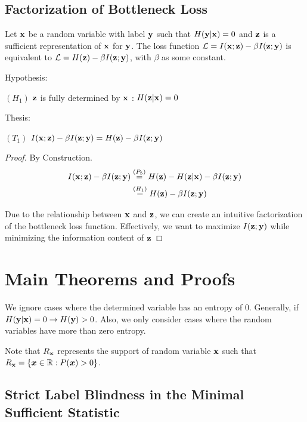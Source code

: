 \subsection{Factorization of Bottleneck Loss}
\label{app:lossfact}

\begin{lemma}
Let ${\mathbf{x}}$ be a random variable with label ${\mathbf{y}}$ such that $H({\mathbf{y}}| {\mathbf{x}}) = 0$ and ${\mathbf{z}}$ is a sufficient representation of ${\mathbf{x}}$ for ${\mathbf{y}}$. The loss function
$\mathcal{L}=I({\mathbf{x}}; {\mathbf{z}})-\beta I({\mathbf{z}}; {\mathbf{y}})$ is equivalent to $\mathcal{L}=H({\mathbf{z}})-\beta I({\mathbf{z}}; {\mathbf{y}})$, with $\beta$ as some constant.

Hypothesis:

$(H_1)$  ${\mathbf{z}}$ is fully determined by ${\mathbf{x}}$ : $H({\mathbf{z}}|{\mathbf{x}}) = 0$

Thesis:

$(T_1)$ $ I({\mathbf{x}}; {\mathbf{z}})-\beta I({\mathbf{z}}; {\mathbf{y}}) = H({\mathbf{z}})-\beta I({\mathbf{z}}; {\mathbf{y}})$

\begin{proof} By Construction.
$$
\begin{aligned}
I({\mathbf{x}}; {\mathbf{z}})-\beta I({\mathbf{z}}; {\mathbf{y}}) &\stackrel{\left(P_5\right)}{=} H({\mathbf{z}}) - H({\mathbf{z}}| {\mathbf{x}}) -\beta I({\mathbf{z}};{\mathbf{y}}) \\
&\stackrel{\left(H_1\right)}{=} H({\mathbf{z}}) -\beta I({\mathbf{z}}; {\mathbf{y}})
\end{aligned}
$$

Due to the relationship between ${\mathbf{x}}$ and ${\mathbf{z}}$, we can create an intuitive factorization of the bottleneck loss function. Effectively, we want to maximize $I({\mathbf{z}}; {\mathbf{y}})$ while minimizing the information content of ${\mathbf{z}}$

\end{proof}

\label{lossfact}
\end{lemma}

\section{Main Theorems and Proofs}
\label{app:mainproofs}

We ignore cases where the determined variable has an entropy of 0. Generally, if $H({\mathbf{y}}| {\mathbf{x}}) = 0 \rightarrow H({\mathbf{y}}) > 0$. Also, we only consider cases where the random variables have more than zero entropy.

Note that $R_{{\mathbf{x}}}$ represents the support of random variable ${\mathbf{x}}$ such that $R_{{\mathbf{x}}} = \{{\bm{x}} \in \mathbb{R} : P({\bm{x}}) > 0\}$.

\subsection{Strict Label Blindness in the Minimal Sufficient Statistic}
\label{app:genloss}

